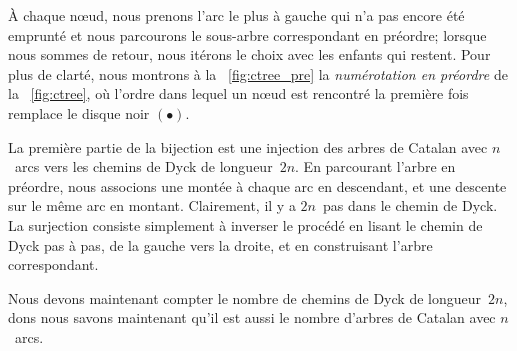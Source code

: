 À chaque nœud, nous prenons l'arc le plus à gauche qui n'a pas
encore été emprunté et nous parcourons le sous-arbre correspondant en
préordre; lorsque nous sommes de retour, nous itérons le choix avec
les enfants qui restent. Pour plus de clarté, nous montrons à la
\fig~\ref{fig:ctree_pre} la \emph{numérotation en
  préordre} de
la \fig~\ref{fig:ctree}, où l'ordre dans lequel un nœud est
rencontré la première fois remplace le disque noir \((\bullet)\).

La première partie de la bijection est une injection des arbres de
Catalan avec \(n\)~arcs vers les chemins de Dyck de
longueur~\(2n\). En parcourant l'arbre en préordre, nous associons une
montée à chaque arc en descendant, et une descente sur le même arc en
montant. Clairement, il y a \(2n\)~pas dans le chemin de Dyck. La
surjection consiste simplement à inverser le procédé en lisant le
chemin de Dyck pas à pas, de la gauche vers la droite, et en
construisant l'arbre correspondant.

Nous devons maintenant compter le nombre de chemins de Dyck de
longueur~\(2n\), dons nous savons maintenant qu'il est aussi le nombre
d'arbres de Catalan avec \(n\)~arcs.

